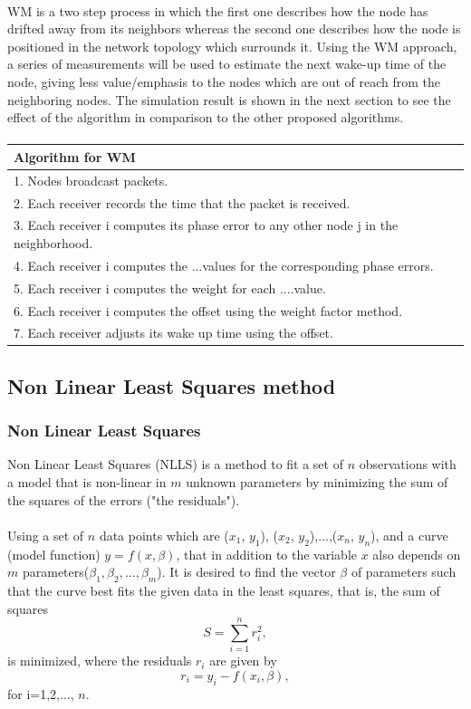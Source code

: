 \documentclass[a4paper,10pt]{report}
\begin{document}
\paragraph*{}
WM is a two step process in which the first one describes how the node has drifted away from its neighbors
whereas the second one describes how the node is positioned in the network topology which surrounds it. Using the WM approach, a series of measurements will be used to estimate the next wake-up time of the node, giving less value/emphasis to the nodes which are out of reach from the neighboring nodes. The simulation result is shown in the next section to see the effect of the algorithm in comparison to the other proposed algorithms.\paragraph*{}
\begin{tabular}{  l }Algorithm for WM \\\hline \hline
1. Nodes broadcast packets. \\  2. Each receiver records the time that the packet is received. \\
3. Each receiver i computes its phase error to any other node j in the neighborhood. \\
4. Each receiver i computes the ...values for the corresponding phase errors. \\
5. Each receiver i computes the weight for each ....value. \\
6. Each receiver i computes the offset using the weight factor method. \\
7. Each receiver adjusts its wake up time using the offset.\\
\hline \hline
\end{tabular}
\subsection{\textbf{Non Linear Least Squares method}}
\subsubsection{Non Linear Least Squares}
Non Linear Least Squares (NLLS) is a method to fit a set of $n$ observations with a model that is non-linear in $m$ unknown parameters by minimizing the sum of the squares of the errors ("the residuals").
\paragraph*{}
Using a set of $n$ data points which are ($x_1$, $y_1$), ($x_2$, $y_2$),$\dots$,($x_n$, $y_n$), and a curve (model function) $y= f(x, \beta)$, that in addition to the variable $x$ also depends on $m$ parameters($\beta_1,\beta_2,...,\beta_m$).
It is desired to find the vector $\beta$ of parameters such that the curve best fits the given data in the least squares, that is, the sum of squares
\begin{equation}
    S=\sum_{i=1}^{n}r_i^2 ,
\end{equation}
is minimized, where the residuals $r_i$ are given by
\begin{equation}
    r_i = y_i - f(x_i,\beta),
\end{equation}
for i=1,2,$\dots$, $n$.
\end{document}
